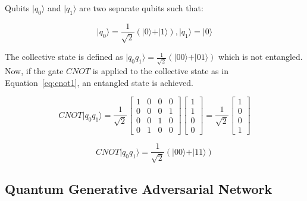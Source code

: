 Qubits $\vert q_0 \rangle$ and $\vert q_1 \rangle$ are two separate qubits such 
that:

\begin{linenomath}
\begin{equation}
\vert q_0 \rangle = \frac{1}{\sqrt{2}} (\vert 0 \rangle + \vert 1 \rangle), 
\vert q_1 \rangle = \vert 0 \rangle
\label{eq:q0}
\end{equation}
\end{linenomath}

The collective state is defined as $\vert q_0q_1 \rangle = \frac{1}{\sqrt{2}} 
(\vert 00 \rangle + \vert 01 \rangle)$ which is not entangled. Now, if the gate
$CNOT$ is applied to the collective state as in Equation~\ref{eq:cnot1}, an
entangled state is achieved.

\begin{linenomath}
\begin{equation}
CNOT\vert q_0q_1 \rangle = \frac{1}{\sqrt{2}} \begin{bmatrix} 1 & 0 & 0 & 0 \\ 0 & 0 & 0 & 1 \\ 0 & 0 & 1 & 0 \\ 0 & 1 & 0 & 0 \end{bmatrix} \begin{bmatrix} 1\\1\\0\\0 \end{bmatrix} = \frac{1}{\sqrt{2}} \begin{bmatrix} 1\\0\\0\\1 \end{bmatrix} 
\label{eq:cnot1}
\end{equation}
\end{linenomath}

\begin{linenomath}
\begin{equation}
CNOT\vert q_0q_1 \rangle = \frac{1}{\sqrt{2}} (\vert 00 \rangle + \vert 11 \rangle)
\label{eq:cnot2}
\end{equation}
\end{linenomath}

\subsection{Quantum Generative Adversarial Network}
\label{sec:qgans}

